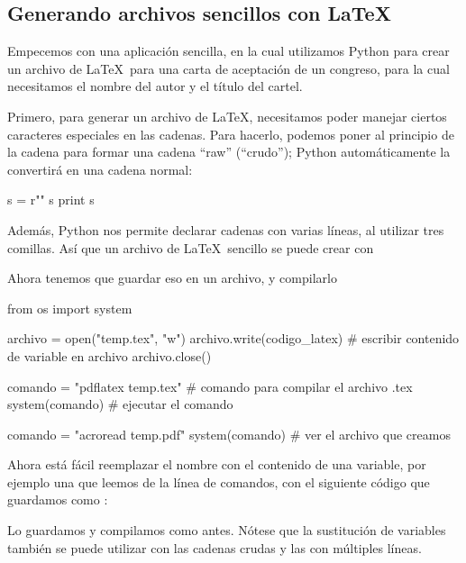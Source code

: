 \subsection{Generando archivos sencillos con \LaTeX}
Empecemos con una aplicación sencilla, en la cual utilizamos Python para crear un archivo de \LaTeX\ para una carta de aceptación de un congreso, para la cual necesitamos el nombre del autor y el título del cartel.

Primero, para generar un archivo de \LaTeX, necesitamos poder manejar ciertos caracteres especiales en las cadenas. Para hacerlo, podemos poner  al principio de la cadena para formar una cadena ``raw'' (``crudo''); Python automáticamente la convertirá en una cadena normal:
\begin{python}
s = r""       
s
print s
\end{python}
Además, Python nos permite declarar cadenas con varias líneas, al utilizar tres comillas. Así que un archivo de \LaTeX\ sencillo se puede crear con
Ahora tenemos que guardar eso en un archivo, y compilarlo
\begin{python}
from os import system

archivo = open("temp.tex", "w")
archivo.write(codigo_latex)	# escribir contenido de variable en archivo
archivo.close()

comando = "pdflatex temp.tex"	# comando para compilar el archivo .tex
system(comando)	# ejecutar el comando

comando = "acroread temp.pdf"
system(comando)	# ver el archivo que creamos
\end{python}

Ahora está fácil reemplazar el nombre con el contenido de una variable, por ejemplo una que leemos de la línea de comandos, con el siguiente código que guardamos como :
Lo guardamos y compilamos como antes. Nótese que la sustitución de variables también se puede utilizar con las cadenas crudas y las con múltiples líneas.

